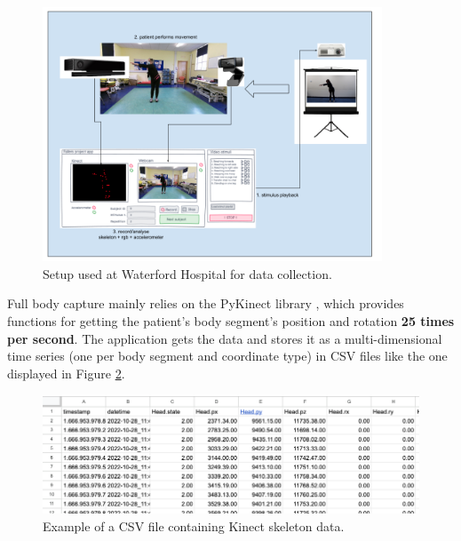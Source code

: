                     \begin{figure}[H]
                        \centering
                        \includegraphics[width=0.9\textwidth]{./resources/images/kinect/setup.png}
                        \caption{Setup used at Waterford Hospital for data collection.}
                        \label{fig:kinect_setup}
                    \end{figure}

                    Full body capture mainly relies on the PyKinect library \cite{GitHubKinectPyKinect2}, which provides functions for getting the patient's body segment's position and rotation \textbf{25 times per second}. The application gets the data and stores it as a multi-dimensional time series (one per body segment and coordinate type) in CSV files like the one displayed in Figure \ref{fig:csv_structure}.
                    \newpage
                    \begin{figure}[H]
                        \centering
                        \includegraphics[width=1.0\textwidth]{./resources/images/other/data.png}
                        \caption{Example of a CSV file containing Kinect skeleton data.}
                        \label{fig:csv_structure}
                    \end{figure}

